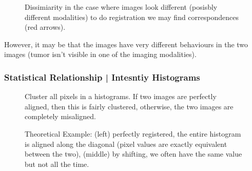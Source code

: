 \documentclass[11pt]{article}
\begin{document}
\begin{figure}[H]
    \centering
    \caption*{Dissimiarity in the case where images look different (posisbly different modalities) to do registration we may find correspondences (red arrows).}
\end{figure}

However, it may be that the images have very different behaviours in the two images (tumor isn't visible in one of the imaging modalities).

\subsubsection{Statistical Relationship | Intesntiy Histograms}

\begin{figure}[H]
    \centering
    \caption*{Cluster all pixels in a histograms. If two images are perfectly aligned, then this is fairly clustered, otherwise, the two images are completely misaligned.}
\end{figure}

\begin{figure}[H]
    \centering
    \caption*{Theoretical Example: (left) perfectly registered, the entire histogram is aligned along the diagonal (pixel values are exactly equivalent between the two), (middle) by shifting, we often have the same value but not all the time.}
\end{figure}

\begin{figure}[H]
    \centering
\end{figure}
\end{document}
